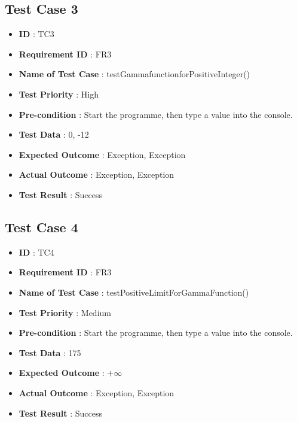 \documentclass[a4paper, 11pt]{article}
\begin{document}
\subsection{Test Case 3}
\begin{itemize}
    \item \textbf{ID} : TC3
    \item \textbf{Requirement ID} : FR3
    \item \textbf{Name of Test Case} : testGammafunctionforPositiveInteger()
    \item \textbf{Test Priority} : High
    \item \textbf{Pre-condition} : Start the programme, then type a value into the console.
    \item \textbf{Test Data} : 0, -12
    \item \textbf{Expected Outcome} : Exception, Exception
    \item \textbf{Actual Outcome} : Exception, Exception
    \item \textbf{Test Result} : Success
\end{itemize}

\subsection{Test Case 4}
\begin{itemize}
    \item \textbf{ID} : TC4
    \item \textbf{Requirement ID} : FR3
    \item \textbf{Name of Test Case} : testPositiveLimitForGammaFunction()
    \item \textbf{Test Priority} : Medium
    \item \textbf{Pre-condition} : Start the programme, then type a value into the console.
    \item \textbf{Test Data} : 175
    \item \textbf{Expected Outcome} : $+\infty$
    \item \textbf{Actual Outcome} : Exception, Exception
    \item \textbf{Test Result} : Success
\end{itemize}
\end{document}
